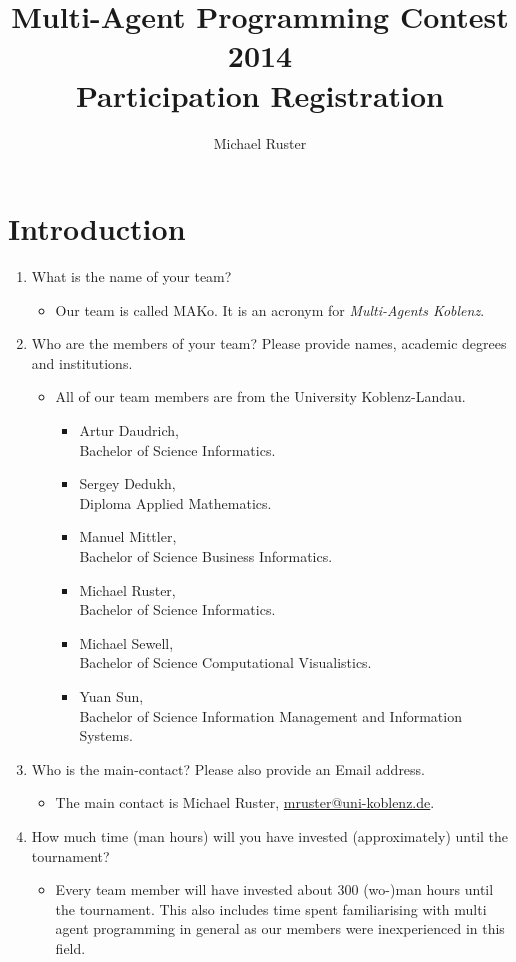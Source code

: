 \documentclass{llncs}
\begin{document}
\title{Multi-Agent Programming Contest 2014\\Participation Registration}
\author{Michael Ruster}
\maketitle

\section*{Introduction}

\begin{enumerate}
\item What is the name of your team?
  \begin{itemize}
    \item Our team is called MAKo. It is an acronym for \emph{Multi-Agents Koblenz}.
  \end{itemize}
\item Who are the members of your team? Please provide names, academic degrees and institutions.
  \begin{itemize}
    \item All of our team members are from the University Koblenz-Landau.\begin{itemize}
    \item Artur Daudrich,\\Bachelor of Science Informatics.
    \item Sergey Dedukh,\\Diploma Applied Mathematics.
    \item Manuel Mittler,\\Bachelor of Science Business Informatics.
    \item Michael Ruster,\\Bachelor of Science Informatics.
    \item Michael Sewell,\\Bachelor of Science Computational Visualistics.
    \item Yuan Sun,\\Bachelor of Science Information Management and Information Systems.
  \end{itemize}
  \end{itemize}
\item Who is the main-contact? Please also provide an Email address.
  \begin{itemize}
    \item The main contact is Michael Ruster, \href{mailto:mruster@uni-koblenz.de}{mruster@uni-koblenz.de}.
  \end{itemize}
\item How much time (man hours) will you have invested (approximately) until the tournament?
  \begin{itemize}
    \item Every team member will have invested about 300 (wo-)man hours until the tournament. This also includes time spent familiarising with multi agent programming in general as our members were inexperienced in this field.
  \end{itemize}


\end{enumerate}
\end{document}
